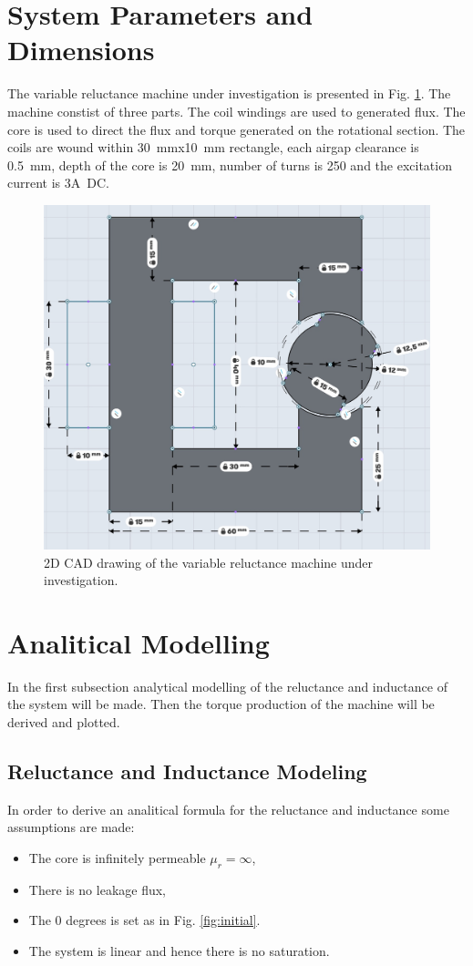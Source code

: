 \documentclass{article}
\begin{document}
\section{System Parameters and Dimensions}
The variable reluctance machine under investigation is presented in Fig. \ref{fig:system}. The machine constist of three parts. The coil windings are used to generated flux. The core is used to direct the flux and torque generated on the rotational section. The coils are wound within 30~mmx10~mm rectangle, each airgap clearance is 0.5~mm, depth of the core is 20~mm, number of turns is 250 and the excitation current is 3A~DC.
\begin{figure}[h!]
	\centering
	\includegraphics[width=0.5\linewidth]{Figurler/system.jpeg}
	\caption{2D CAD drawing of the variable reluctance machine under investigation.}
	\label{fig:system}
\end{figure}
\section{Analitical Modelling}
In the first subsection analytical modelling of the reluctance and inductance of the system will be made. Then the torque production of the machine will be derived and plotted.


\subsection{Reluctance and Inductance Modeling}
In order to derive an analitical formula for the reluctance and inductance some assumptions are made:
\begin{itemize}
	\item The core is infinitely permeable $\mu_{r}=\infty$,
	\item There is no leakage flux,
	\item The 0 degrees is set as in Fig. \ref{fig:initial}.
	\item The system is linear and hence there is no saturation.
\end{itemize}
\end{document}
